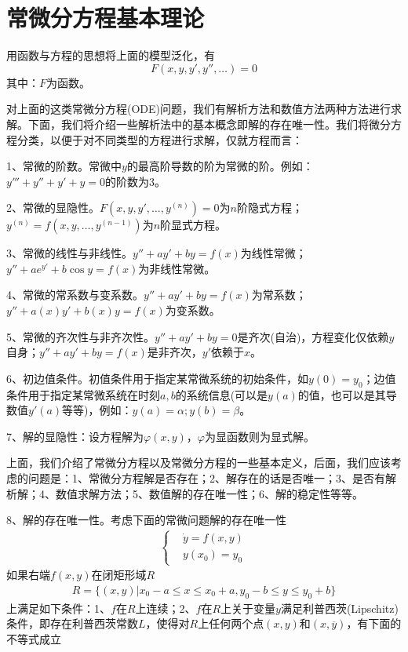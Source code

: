 \section{常微分方程基本理论}
	\par
	用函数与方程的思想将上面的模型泛化，有
	\[
		F(x,y,y',y'',\dots)=0
	\]
	其中：$F$为函数。
	\par
	对上面的这类常微分方程(ODE)问题，我们有解析方法和数值方法两种方法进行求解。下面，我们将介绍一些解析法中的基本概念即解的存在唯一性。我们将微分方程分类，以便于对不同类型的方程进行求解，仅就方程而言：
	\par
	1、常微的阶数。常微中$y$的最高阶导数的阶为常微的阶。例如：$y'''+y''+y'+y=0$的阶数为3。
	\par
	2、常微的显隐性。$F(x,y,y',\dots,y^{(n)})=0$为$n$阶隐式方程；$y^{(n)}=f(x,y,\dots,y^{(n-1)})$为$n$阶显式方程。
	\par
	3、常微的线性与非线性。$y''+ay'+by=f(x)$为线性常微；$y''+ae^{y'}+b\cos y=f(x)$为非线性常微。
	\par
	4、常微的常系数与变系数。$y''+ay'+by=f(x)$为常系数；$y''+a(x)y'+b(x)y=f(x)$为变系数。
	\par
	5、常微的齐次性与非齐次性。$y''+ay'+by=0$是齐次(自治)，方程变化仅依赖$y$自身；$y''+ay'+by=f(x)$是非齐次，$y'$依赖于$x$。
	\par
	6、初边值条件。初值条件用于指定某常微系统的初始条件，如$y(0)=y_0$；边值条件用于指定某常微系统在时刻$a,b$的系统信息(可以是$y(a)$的值，也可以是其导数值$y'(a)$等等)，例如：$y(a)=\alpha;y(b)=\beta$。
	\par
	7、解的显隐性：设方程解为$\varphi (x,y)$，$\varphi$为显函数则为显式解。
	\par
	上面，我们介绍了常微分方程以及常微分方程的一些基本定义，后面，我们应该考虑的问题是：1、常微分方程解是否存在；2、解存在的话是否唯一；3、是否有解析解；4、数值求解方法；5、数值解的存在唯一性；6、解的稳定性等等。
	\par
	8、解的存在唯一性。考虑下面的常微问题解的存在唯一性
	\begin{align*}
		\left\{
			\begin{aligned}
			&\dot{y} = f(x,y)\\
			&y(x_0) = y_0
			\end{aligned}
		\right.
	\end{align*}
	如果右端$f(x,y)$在闭矩形域$R$
	\begin{align*}
		R = \{(x,y)|x_0-a \leqslant x \leqslant x_0+a,y_0-b \leqslant y \leqslant y_0+b\}
	\end{align*}
	上满足如下条件：1、$f$在$R$上连续；2、$f$在$R$上关于变量$y$满足利普西茨(Lipschitz)条件，即存在利普西茨常数$L$，使得对$R$上任何两个点$(x,y)$和$(x,\overline{y})$，有下面的不等式成立
